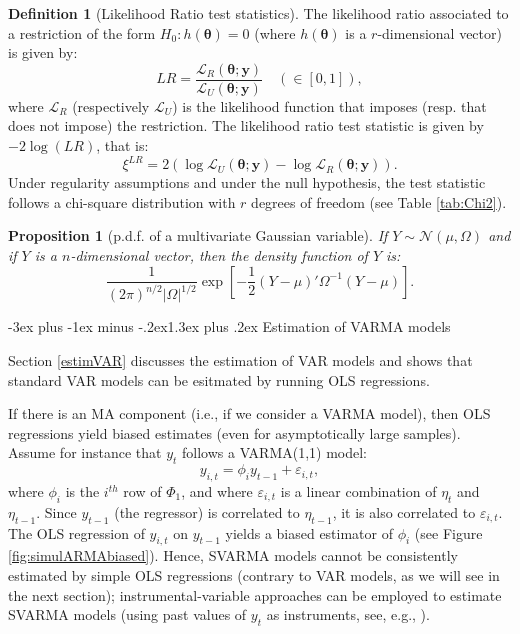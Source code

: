 \documentclass[
  11pt,
]{book}
\makeatletter
\renewcommand\section{\@startsection{section}{1}{\z@}
  {-3ex plus -1ex minus -.2ex}{1.3ex plus .2ex}
  {\normalfont\Large\bfseries\color{TextbookInk}}}
\newtheorem{proposition}{Proposition}[chapter]
\theoremstyle{definition}
\newtheorem{definition}{Definition}[chapter]
\theoremstyle{definition}
\theoremstyle{definition}
\theoremstyle{definition}
\theoremstyle{remark}
\makeatother
\begin{document}
\begin{definition}[Likelihood Ratio test statistics]
\protect\hypertarget{def:LR}{}\label{def:LR}The likelihood ratio associated to a restriction of the form \(H_0: h({\boldsymbol\theta})=0\) (where \(h({\boldsymbol\theta})\) is a \(r\)-dimensional vector) is given by:
\[
LR = \frac{\mathcal{L}_R(\boldsymbol\theta;\mathbf{y})}{\mathcal{L}_U(\boldsymbol\theta;\mathbf{y})} \quad (\in [0,1]),
\]
where \(\mathcal{L}_R\) (respectively \(\mathcal{L}_U\)) is the likelihood function that imposes (resp. that does not impose) the restriction. The likelihood ratio test statistic is given by \(-2\log(LR)\), that is:
\[
\boxed{\xi^{LR}= 2 (\log\mathcal{L}_U(\boldsymbol\theta;\mathbf{y})-\log\mathcal{L}_R(\boldsymbol\theta;\mathbf{y})).}
\]
Under regularity assumptions and under the null hypothesis, the test statistic follows a chi-square distribution with \(r\) degrees of freedom (see Table \ref{tab:Chi2}).
\end{definition}

\begin{proposition}[p.d.f. of a multivariate Gaussian variable]
\protect\hypertarget{prp:pdfMultivarGaussian}{}\label{prp:pdfMultivarGaussian}If \(Y \sim \mathcal{N}(\mu,\Omega)\) and if \(Y\) is a \(n\)-dimensional vector, then the density function of \(Y\) is:
\[
\frac{1}{(2 \pi)^{n/2}|\Omega|^{1/2}}\exp\left[-\frac{1}{2}\left(Y-\mu\right)'\Omega^{-1}\left(Y-\mu\right)\right].
\]
\end{proposition}

\section{Estimation of VARMA models}\label{AppEstimVARMA}

Section \ref{estimVAR} discusses the estimation of VAR models and shows that standard VAR models can be esitmated by running OLS regressions.

If there is an MA component (i.e., if we consider a VARMA model), then OLS regressions yield biased estimates (even for asymptotically large samples). Assume for instance that \(y_t\) follows a VARMA(1,1) model:
\[
y_{i,t} = \phi_i y_{t-1} + \varepsilon_{i,t},
\]
where \(\phi_i\) is the \(i^{th}\) row of \(\Phi_1\), and where \(\varepsilon_{i,t}\) is a linear combination of \(\eta_t\) and \(\eta_{t-1}\). Since \(y_{t-1}\) (the regressor) is correlated to \(\eta_{t-1}\), it is also correlated to \(\varepsilon_{i,t}\). The OLS regression of \(y_{i,t}\) on \(y_{t-1}\) yields a biased estimator of \(\phi_i\) (see Figure \ref{fig:simulARMAbiased}). Hence, SVARMA models cannot be consistently estimated by simple OLS regressions (contrary to VAR models, as we will see in the next section); instrumental-variable approaches can be employed to estimate SVARMA models (using past values of \(y_t\) as instruments, see, e.g., \citet{Gourieroux_Monfort_Renne_2020}).
\end{document}
